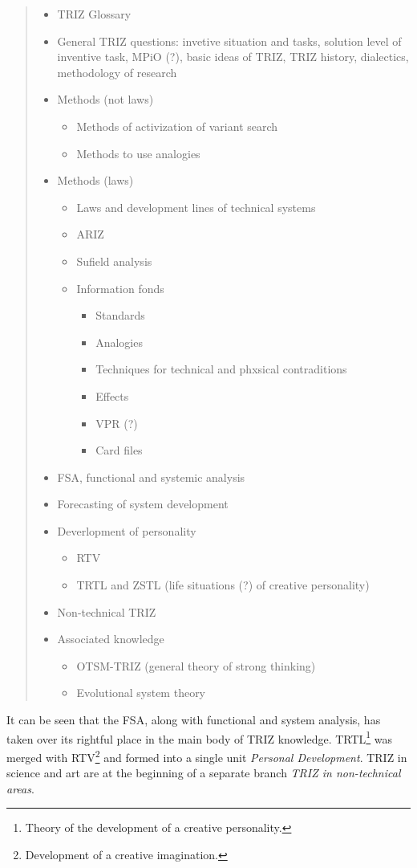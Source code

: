 \documentclass[11pt,a4paper]{article}
\begin{document}
\begin{quote}
  \begin{itemize}[noitemsep]
  \item TRIZ Glossary
  \item General TRIZ questions: invetive situation and tasks, solution level
    of inventive task, MPiO (?), basic ideas of TRIZ, TRIZ history,
    dialectics, methodology of research
  \item Methods (not laws)
    \begin{itemize}[noitemsep]
    \item Methods of activization of variant search
    \item Methods to use analogies
    \end{itemize}
  \item Methods (laws)
    \begin{itemize}[noitemsep]
    \item Laws and development lines of technical systems
    \item ARIZ
    \item Sufield analysis
    \item Information fonds
      \begin{itemize}[noitemsep]
      \item Standards
      \item Analogies
      \item Techniques for technical and phxsical contraditions
      \item Effects
      \item VPR (?)
      \item Card files
      \end{itemize}
    \end{itemize}
  \item FSA, functional and systemic analysis
  \item Forecasting of system development
  \item Deverlopment of personality 
    \begin{itemize}[noitemsep]
    \item RTV
    \item TRTL and ZSTL (life situations (?) of creative personality)
    \end{itemize}
  \item Non-technical TRIZ 
  \item Associated knowledge
    \begin{itemize}[noitemsep]
    \item OTSM-TRIZ (general theory of strong thinking)
    \item Evolutional system theory
    \end{itemize}
  \end{itemize}
\end{quote}
It can be seen that the FSA, along with functional and system analysis, has
taken over its rightful place in the main body of TRIZ knowledge.
TRTL\footnote{Theory of the development of a creative personality.} was merged
with RTV\footnote{Development of a creative imagination.} and formed into a
single unit \emph{Personal Development}. TRIZ in science and art are at the
beginning of a separate branch \emph{TRIZ in non-technical areas}.
\end{document}
